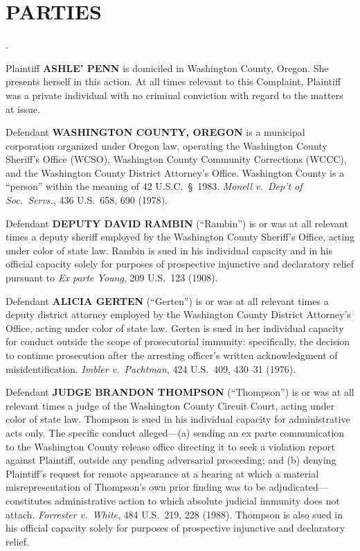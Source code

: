 \documentclass[12pt,letterpaper]{article}
\newcounter{complaintpara}
\newenvironment{paras}{%
	\begin{list}{\arabic{complaintpara}.}{%
			\setlength{\leftmargin}{0.5in}%
			\setlength{\labelwidth}{0.4in}%
			\setlength{\labelsep}{0.1in}%
			\setlength{\itemsep}{0pt}%
			\setlength{\parsep}{0pt}%
			\setlength{\topsep}{6pt}%
		}%
	}{%
	\end{list}%
}
\newcommand{\sect}{§}
\begin{document}
	\section*{PARTIES}
	\begin{paras}
		
		\item Plaintiff \textbf{ASHLE' PENN} is domiciled in Washington
		County, Oregon. She presents herself in this action. At all times
		relevant to this Complaint, Plaintiff was a private individual with
		no criminal conviction with regard to the matters at issue.
		
		\item Defendant \textbf{WASHINGTON COUNTY, OREGON} is a municipal
		corporation organized under Oregon law, operating the Washington
		County Sheriff's Office (WCSO), Washington County Community
		Corrections (WCCC), and the Washington County District Attorney's
		Office. Washington County is a ``person'' within the meaning of
		42 U.S.C.\ \sect\ 1983. \textit{Monell v.\ Dep't of Soc.\ Servs.},
		436 U.S.\ 658, 690 (1978).
		
		\item Defendant \textbf{DEPUTY DAVID RAMBIN} (``Rambin'') is or was
		at all relevant times a deputy sheriff employed by the Washington
		County Sheriff's Office, acting under color of state law. Rambin is
		sued in his individual capacity and in his official capacity solely
		for purposes of prospective injunctive and declaratory relief
		pursuant to \textit{Ex parte Young}, 209 U.S.\ 123 (1908).
		
		\item Defendant \textbf{ALICIA GERTEN} (``Gerten'') is or was at all
		relevant times a deputy district attorney employed by the Washington
		County District Attorney's Office, acting under color of state law.
		Gerten is sued in her individual capacity for conduct outside the
		scope of prosecutorial immunity: specifically, the decision to
		continue prosecution after the arresting officer's written
		acknowledgment of misidentification. \textit{Imbler v.\ Pachtman},
		424 U.S.\ 409, 430--31 (1976).
		
		\item Defendant \textbf{JUDGE BRANDON THOMPSON} (``Thompson'') is or
		was at all relevant times a judge of the Washington County Circuit
		Court, acting under color of state law. Thompson is sued in his
		individual capacity for administrative acts only. The specific
		conduct alleged---(a) sending an ex parte communication to the
		Washington County release office directing it to seek a violation
		report against Plaintiff, outside any pending adversarial
		proceeding; and (b) denying Plaintiff's request for remote
		appearance at a hearing at which a material misrepresentation of
		Thompson's own prior finding was to be adjudicated---constitutes
		administrative action to which absolute judicial immunity does not
		attach. \textit{Forrester v.\ White}, 484 U.S.\ 219, 228 (1988).
		Thompson is also sued in his official capacity solely for purposes
		of prospective injunctive and declaratory relief.
		

\end{paras}
\end{document}
